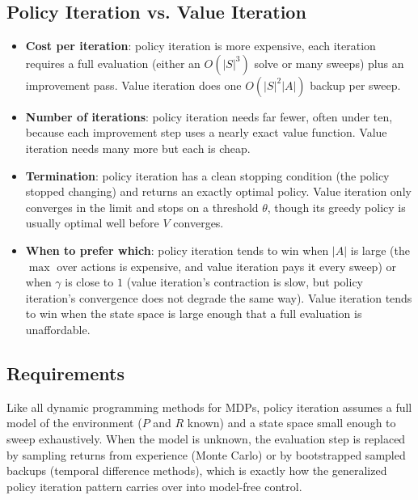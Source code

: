 \documentclass[conference]{IEEEtran}
\begin{document}
\subsection*{Policy Iteration vs. Value Iteration}
\begin{itemize}
    \item \textbf{Cost per iteration}: policy iteration is more expensive, each iteration requires a full evaluation (either an $O(|S|^3)$ solve or many sweeps) plus an improvement pass. Value iteration does one $O(|S|^2|A|)$ backup per sweep.
    \item \textbf{Number of iterations}: policy iteration needs far fewer, often under ten, because each improvement step uses a nearly exact value function. Value iteration needs many more but each is cheap.
    \item \textbf{Termination}: policy iteration has a clean stopping condition (the policy stopped changing) and returns an exactly optimal policy. Value iteration only converges in the limit and stops on a threshold $\theta$, though its greedy policy is usually optimal well before $V$ converges.
    \item \textbf{When to prefer which}: policy iteration tends to win when $|A|$ is large (the $\max$ over actions is expensive, and value iteration pays it every sweep) or when $\gamma$ is close to $1$ (value iteration's contraction is slow, but policy iteration's convergence does not degrade the same way). Value iteration tends to win when the state space is large enough that a full evaluation is unaffordable.
\end{itemize}

\subsection*{Requirements}
Like all dynamic programming methods for MDPs, policy iteration assumes a full model of the environment ($P$ and $R$ known) and a state space small enough to sweep exhaustively. When the model is unknown, the evaluation step is replaced by sampling returns from experience (Monte Carlo) or by bootstrapped sampled backups (temporal difference methods), which is exactly how the generalized policy iteration pattern carries over into model-free control.
\end{document}
